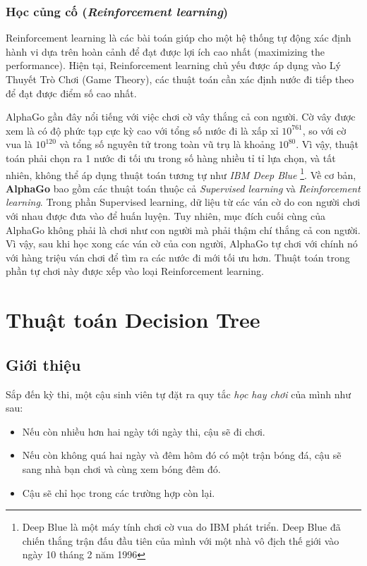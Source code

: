 \documentclass[../main-report.tex]{subfiles}
\begin{document}
\subsubsection*{Học củng cố (\emph{Reinforcement learning})}
Reinforcement learning là các bài toán giúp cho một hệ thống tự động xác định hành vi dựa trên hoàn cảnh để đạt được lợi ích cao nhất (maximizing the performance). Hiện tại, Reinforcement learning chủ yếu được áp dụng vào Lý Thuyết Trò Chơi (Game Theory), các thuật toán cần xác định nước đi tiếp theo để đạt được điểm số cao nhất.

\begin{example}
AlphaGo gần đây nổi tiếng với việc chơi cờ vây thắng cả con người. Cờ vây được xem là có độ phức tạp cực kỳ cao với tổng số nước đi là xấp xỉ \(10^{761} \), so với cờ vua là \(10^{120} \) và tổng số nguyên tử trong toàn vũ trụ là khoảng \(10^{80}\). Vì vậy, thuật toán phải chọn ra 1 nước đi tối ưu trong số hàng nhiều tỉ tỉ lựa chọn, và tất nhiên, không thể áp dụng thuật toán tương tự như \emph{IBM Deep Blue} \footnote{Deep Blue là một máy tính chơi cờ vua do IBM phát triển. Deep Blue đã chiến thắng trận đấu đầu tiên của mình với một nhà vô địch thế giới vào ngày 10 tháng 2 năm 1996}. Về cơ bản, \textbf{AlphaGo} bao gồm các thuật toán thuộc cả \emph{Supervised learning} và \emph{Reinforcement learning}. Trong phần Supervised learning, dữ liệu từ các ván cờ do con người chơi với nhau được đưa vào để huấn luyện. Tuy nhiên, mục đích cuối cùng của AlphaGo không phải là chơi như con người mà phải thậm chí thắng cả con người. Vì vậy, sau khi học xong các ván cờ của con người, AlphaGo tự chơi với chính nó với hàng triệu ván chơi để tìm ra các nước đi mới tối ưu hơn. Thuật toán trong phần tự chơi này được xếp vào loại Reinforcement learning. 
\end{example}
\section{Thuật toán Decision Tree}
\subsection{Giới thiệu}
Sắp đến kỳ thi, một cậu sinh viên tự đặt ra quy tắc \textit{học hay chơi} của mình như sau:

\begin{itemize}
\item Nếu còn nhiều hơn hai ngày tới ngày thi, cậu sẽ đi chơi.
\item Nếu còn không quá hai ngày và đêm hôm đó có một trận bóng đá, cậu sẽ sang nhà bạn chơi và cùng xem bóng đêm đó.
\item Cậu sẽ chỉ học trong các trường hợp còn lại.
\end{itemize}
\end{document}
